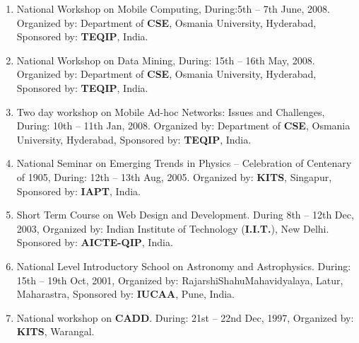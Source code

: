 \begin{enumerate}
\item
National Workshop on Mobile Computing, During:5th – 7th June, 2008. Organized by: Department of \textbf{CSE}, Osmania University, Hyderabad, Sponsored by: \textbf{TEQIP}, India. 

\item
National Workshop on Data Mining, During: 15th – 16th May, 2008. Organized by: Department of \textbf{CSE}, Osmania University, Hyderabad, Sponsored by: \textbf{TEQIP}, India. 

\item
Two day workshop on Mobile Ad-hoc Networks: Issues and Challenges, During: 10th – 11th Jan, 2008. Organized by: Department of \textbf{CSE}, Osmania University, Hyderabad, Sponsored by: \textbf{TEQIP}, India. 

\item
National Seminar on Emerging Trends in Physics – Celebration of Centenary of 1905, During: 12th – 13th Aug, 2005. Organized by: \textbf{KITS}, Singapur, Sponsored by: \textbf{IAPT}, India.

\item
Short Term Course on Web Design and Development. During 8th – 12th Dec, 2003, Organized by: Indian Institute of Technology (\textbf{I.I.T.}), New Delhi. Sponsored by: \textbf{AICTE-QIP}, India. 

\item
National Level Introductory School on Astronomy and Astrophysics. During: 15th – 19th Oct, 2001, Organized by: RajarshiShahuMahavidyalaya, Latur, Maharastra, Sponsored by: \textbf{IUCAA}, Pune, India.

\item
National workshop on \textbf{CADD}. During: 21st – 22nd Dec, 1997, Organized by: \textbf{KITS}, Warangal.

\end{enumerate}